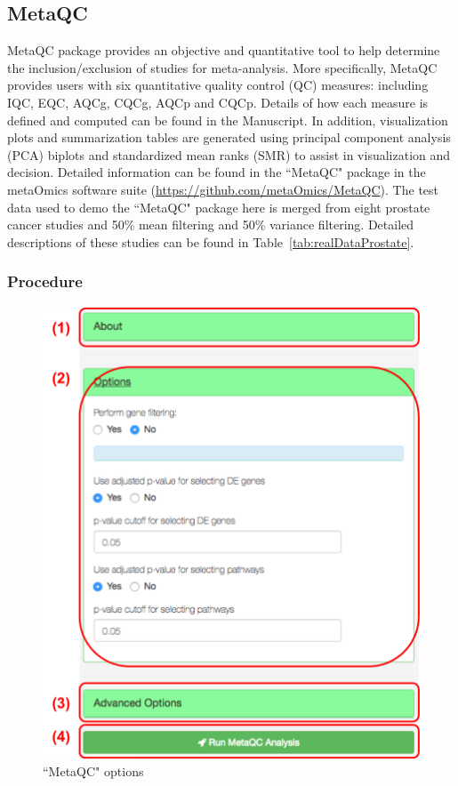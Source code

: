 \subsection{MetaQC}
MetaQC package provides an objective and quantitative tool to help determine the inclusion/exclusion of studies for meta-analysis. More specifically, MetaQC provides users with six quantitative quality control (QC) measures: including IQC, EQC, AQCg, CQCg, AQCp and CQCp. Details of how each measure is defined and computed can be found in the Manuscript. In addition, visualization plots and summarization tables are generated using principal component analysis (PCA) biplots and standardized mean ranks (SMR) to assist in visualization and decision. Detailed information can be found in the ``MetaQC" package in the metaOmics software suite (\url{https://github.com/metaOmics/MetaQC}). The test data used to demo the ``MetaQC" package here is merged from eight prostate cancer studies and 50\% mean filtering and 50\% variance filtering. 
Detailed descriptions of these studies can be found in Table~\ref{tab:realDataProstate}. 

\subsubsection{Procedure}

\begin{figure}[H]
\begin{center}
\includegraphics[scale=0.4]{./figure/metaQC/metaQCoption.pdf}
\caption{``MetaQC" options}
\label{fig:MetaQCoption}
\end{center}
\end{figure}


